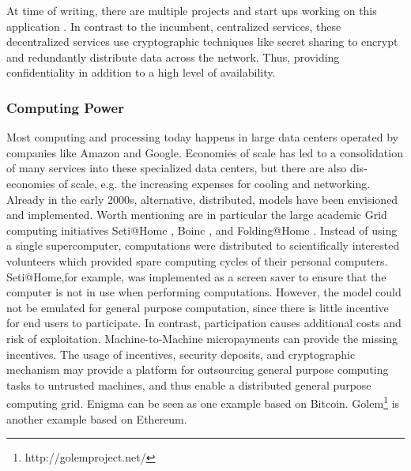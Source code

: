 At time of writing, there are multiple projects and start ups working on this application \parencite{Vorick2014sia,filecoin2014,maidsafe2014,storj2014}. 
In contrast to the incumbent, centralized services, these decentralized services use cryptographic techniques like secret sharing \parencite{Shamir:1979:SS:359168.359176} to encrypt and redundantly distribute data across the network. Thus, providing confidentiality in addition to a high level of availability. 

\subsubsection{Computing Power}

Most computing and processing today happens in large data centers operated by companies like Amazon and Google. Economies of scale has led to a consolidation of many services into these specialized data centers, but there are also dis-economies of scale, e.g. the increasing expenses for cooling and networking. Already in the early 2000s, alternative, distributed, models have been envisioned and implemented. Worth mentioning are in particular the large academic Grid computing initiatives Seti@Home \parencite{Anderson:2002:SEP:581571.581573}, Boinc \parencite{Anderson2004boinc}, and Folding@Home \parencite{Beberg2009Folding}. Instead of using a single supercomputer, computations were distributed to scientifically interested volunteers which provided spare computing cycles of their personal computers. Seti@Home,for example, was implemented as a screen saver to ensure that the computer is not in use when performing computations. However, the model could not be emulated for general purpose computation, since there is little incentive for end users to participate. In contrast, participation causes additional costs and risk of exploitation.
Machine-to-Machine micropayments can provide the missing incentives. The usage of incentives, security deposits, and cryptographic mechanism may provide a platform for outsourcing general purpose computing tasks to untrusted machines, and thus enable a distributed general purpose computing grid. Enigma can be seen as one example based on Bitcoin. Golem\footnote{http://golemproject.net/} is another example based on Ethereum.



